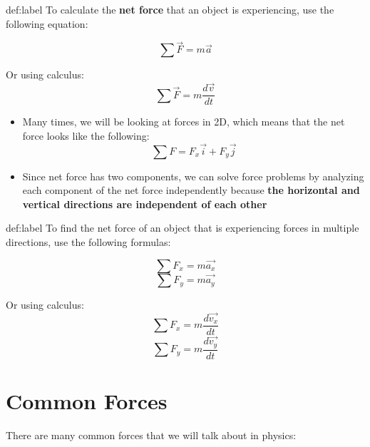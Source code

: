 \begin{definition}{def:label}
	To calculate the \textbf{net force} that an object is experiencing, use the following equation:

	$$
		\sum{\vec{F}} = m\vec{a}
	$$

	Or using calculus:
	$$
		\sum{\vec{F}} = m\frac{d\vec{v}}{{dt}}
	$$
\end{definition}

\begin{itemize}
	\item Many times, we will be looking at forces in 2D, which means that the net force looks like the following:
	$$
		\sum F = F_x \vec{i} + F_y \vec{j}
	$$
	\item Since net force has two components, we can solve force problems by analyzing each component of the net force independently because \textbf{the horizontal and vertical directions are independent of each other}
\end{itemize}

\begin{definition}{def:label}
	To find the net force of an object that is experiencing forces in multiple directions, use the following formulas:

	$$
		\sum F_x = m\vec{a_x}
	$$
	$$
		\sum F_y = m\vec{a_y}
	$$

	Or using calculus:
	$$
		\sum F_x = m\frac{d\vec{v_x}}{dt}
	$$
	$$
		\sum F_y = m\frac{d\vec{v_y}}{dt}
	$$
\end{definition}
\newpage

\section{Common Forces}

There are many common forces that we will talk about in physics:

